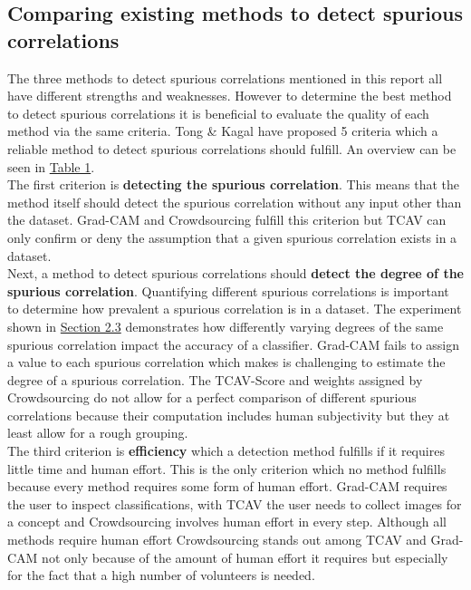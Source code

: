 \documentclass{article}
\begin{document}
\subsection{Comparing existing methods to detect spurious correlations}
The three methods to detect spurious correlations mentioned in this report all have different strengths and weaknesses. However to determine the best method to detect spurious correlations it is beneficial to evaluate the quality of each method via the same criteria. Tong \& Kagal \cite{tong2020investigating} have proposed 5 criteria which a reliable method to detect spurious correlations should fulfill. An overview can be seen in \hyperref[tab:comparison]{Table 1}.\\
The first criterion is \textbf{detecting the spurious correlation}. This means that the method itself should detect the spurious correlation without any input other than the dataset. Grad-CAM and Crowdsourcing fulfill this criterion but TCAV can only confirm or deny the assumption that a given spurious correlation exists in a dataset. \\
Next, a method to detect spurious correlations should \textbf{detect the degree of the spurious correlation}. Quantifying different spurious correlations is important to determine how prevalent a spurious correlation is in a dataset. The experiment shown in \hyperref[sec:motivation]{Section 2.3} demonstrates how differently varying degrees of the same spurious correlation impact the accuracy of a classifier. Grad-CAM fails to assign a value to each spurious correlation which makes is challenging to estimate the degree of a spurious correlation. The TCAV-Score and weights assigned by Crowdsourcing do not allow for a perfect comparison of different spurious correlations because their computation includes human subjectivity but they at least allow for a rough grouping. \\
The third criterion is \textbf{efficiency} which a detection method fulfills if it requires little time and human effort. This is the only criterion which no method fulfills because every method requires some form of human effort. Grad-CAM requires the user to inspect classifications, with TCAV the user needs to collect images for a concept and Crowdsourcing involves human effort in every step. Although all methods require human effort Crowdsourcing stands out among TCAV and Grad-CAM not only because of the amount of human effort it requires but especially for the fact that a high number of volunteers is needed. \\
\end{document}
